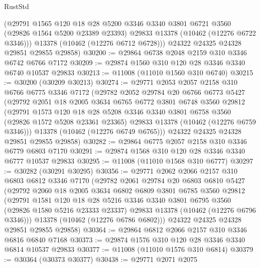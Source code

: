 \begin{lexlean}{RustStd}
\begin{coremodule}
        (@29791
          @1565
          @120
          @18
          @28
          @5200
          @3346
          @3340
          @3801
          @6721
          @3560
          (@29826 @1564 @5200 @23389 @23393)
          @29833
          @13378
          (@10462 (@12276 @6722 @3346)))
        @13378
        (@10462 (@12276 @6712 @6728)))
      @24322
      @24325
      @24328
      @29851
      @29855
      @29858)
@30200 := @29864 @6738 @2048 @2159 @310 @3346 @6742 @6766 @7172
@30209 := @29874 @1560 @310 @120 @28 @3346 @3340 @6740 @10537 @29833
@30213 := @11008 (@11010 @1560 @310 @6740)
@30215 := @30200 (@30209 @30213)
@30274 := @29771
    @2053
    @2057
    @2158
    @310
    @6766
    @6775
    @3346
    @7172
    (@29782
      @2052
      @29784
      @20
      @6766
      @6773
      @5427
      (@29792
        @2051
        @18
        @2005
        @3634
        @6765
        @6772
        @3801
        @6748
        @3560
        @29812
        (@29791
          @1573
          @120
          @18
          @28
          @5208
          @3346
          @3340
          @3801
          @6758
          @3560
          (@29826 @1572 @5208 @23361 @23365)
          @29833
          @13378
          (@10462 (@12276 @6759 @3346)))
        @13378
        (@10462 (@12276 @6749 @6765)))
      @24322
      @24325
      @24328
      @29851
      @29855
      @29858)
@30282 := @29864 @6775 @2057 @2158 @310 @3346 @6779 @6803 @7170
@30291 := @29874 @1568 @310 @120 @28 @3346 @3340 @6777 @10537 @29833
@30295 := @11008 (@11010 @1568 @310 @6777)
@30297 := @30282 (@30291 @30295)
@30356 := @29771
    @2062
    @2066
    @2157
    @310
    @6803
    @6812
    @3346
    @7170
    (@29782
      @2061
      @29784
      @20
      @6803
      @6810
      @5427
      (@29792
        @2060
        @18
        @2005
        @3634
        @6802
        @6809
        @3801
        @6785
        @3560
        @29812
        (@29791
          @1581
          @120
          @18
          @28
          @5216
          @3346
          @3340
          @3801
          @6795
          @3560
          (@29826 @1580 @5216 @23333 @23337)
          @29833
          @13378
          (@10462 (@12276 @6796 @3346)))
        @13378
        (@10462 (@12276 @6786 @6802)))
      @24322
      @24325
      @24328
      @29851
      @29855
      @29858)
@30364 := @29864 @6812 @2066 @2157 @310 @3346 @6816 @6840 @7168
@30373 := @29874 @1576 @310 @120 @28 @3346 @3340 @6814 @10537 @29833
@30377 := @11008 (@11010 @1576 @310 @6814)
@30379 := @30364 (@30373 @30377)
@30438 := @29771
    @2071
    @2075

\end{coremodule}
\end{lexlean}
